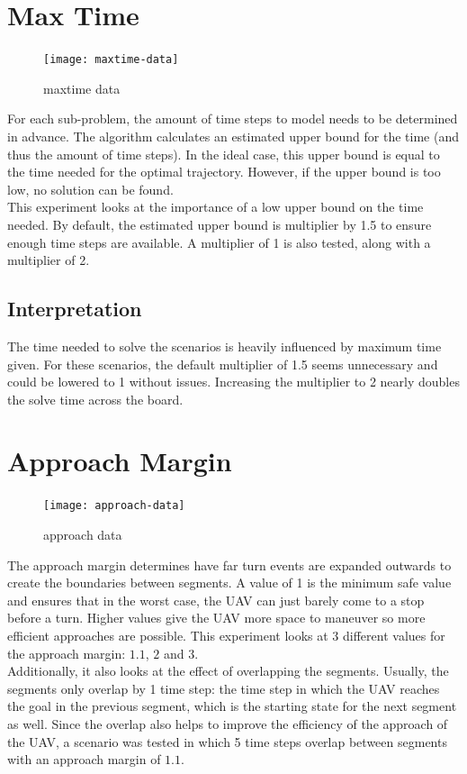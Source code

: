 \clearpage
\section{Max Time}
\label{subsec:maxtime}
\begin{figure}[]
	\centering
	\texttt{[image: maxtime-data]}
	\caption{maxtime data}
	\label{fig:maxtime-data}
\end{figure}
For each sub-problem, the amount of time steps to model needs to be determined in advance. The algorithm calculates an estimated upper bound for the time (and thus the amount of time steps). In the ideal case, this upper bound is equal to the time needed for the optimal trajectory. However, if the upper bound is too low, no solution can be found.\\
This experiment looks at the importance of a low upper bound on the time needed. By default, the estimated upper bound is multiplier by 1.5 to ensure enough time steps are available. A multiplier of 1 is also tested, along with a multiplier of 2. 

\subsection{Interpretation}
The time needed to solve the scenarios is heavily influenced by maximum time given. For these scenarios, the default multiplier of 1.5 seems unnecessary and could be lowered to 1 without issues. Increasing the multiplier to 2 nearly doubles the solve time across the board.


\clearpage
\section{Approach Margin}
\label{subsec:approach-margin}
\begin{figure}[]
	\centering
	\texttt{[image: approach-data]}
	\caption{approach data}
	\label{fig:approach-data}
\end{figure}
The approach margin determines have far turn events are expanded outwards to create the boundaries between segments. A value of 1 is the minimum safe value and ensures that in the worst case, the UAV can just barely come to a stop before a turn. Higher values give the UAV more space to maneuver so more efficient approaches are possible. This experiment looks at 3 different values for the approach margin: $1.1$, $2$ and $3$. \\
Additionally, it also looks at the effect of overlapping the segments. Usually, the segments only overlap by 1 time step: the time step in which the UAV reaches the goal in the previous segment, which is the starting state for the next segment as well. Since the overlap also helps to improve the efficiency of the approach of the UAV, a scenario was tested in which 5 time steps overlap between segments with an approach margin of $1.1$.

